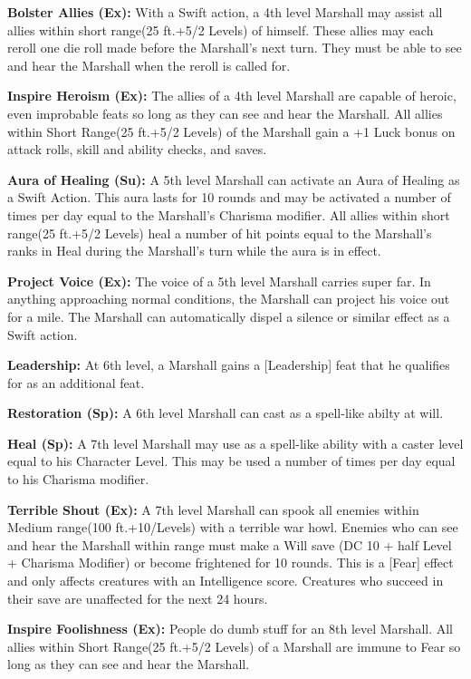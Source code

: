 \textbf{Bolster Allies (Ex):} With a Swift action, a 4th level Marshall may assist all allies within short range(25 ft.+5/2 Levels) of himself. These allies may each reroll one die roll made before the Marshall's next turn. They must be able to see and hear the Marshall when the reroll is called for.

\textbf{Inspire Heroism (Ex):} The allies of a 4th level Marshall are capable of heroic, even improbable feats so long as they can see and hear the Marshall. All allies within Short Range(25 ft.+5/2 Levels) of the Marshall gain a +1 Luck bonus on attack rolls, skill and ability checks, and saves.

\textbf{Aura of Healing (Su):} A 5th level Marshall can activate an Aura of Healing as a Swift Action. This aura lasts for 10 rounds and may be activated a number of times per day equal to the Marshall's Charisma modifier. All allies within short range(25 ft.+5/2 Levels) heal a number of hit points equal to the Marshall's ranks in Heal during the Marshall's turn while the aura is in effect. 

\textbf{Project Voice (Ex):} The voice of a 5th level Marshall carries super far. In anything approaching normal conditions, the Marshall can project his voice out for a mile. The Marshall can automatically dispel a silence or similar effect as a Swift action.

\textbf{Leadership:} At 6th level, a Marshall gains a [Leadership] feat that he qualifies for as an additional feat.

\textbf{Restoration (Sp):} A 6th level Marshall can cast  as a spell-like abilty at will.

\textbf{Heal (Sp):} A 7th level Marshall may use  as a spell-like ability with a caster level equal to his Character Level. This may be used a number of times per day equal to his Charisma modifier.

\textbf{Terrible Shout (Ex):} A 7th level Marshall can spook all enemies within Medium range(100 ft.+10/Levels) with a terrible war howl. Enemies who can see and hear the Marshall within range must make a Will save (DC 10 + half Level + Charisma Modifier) or become frightened for 10 rounds. This is a [Fear] effect and only affects creatures with an Intelligence score. Creatures who succeed in their save are unaffected for the next 24 hours.

\textbf{Inspire Foolishness (Ex):} People do dumb stuff for an 8th level Marshall. All allies within Short Range(25 ft.+5/2 Levels) of a Marshall are immune to Fear so long as they can see and hear the Marshall.

